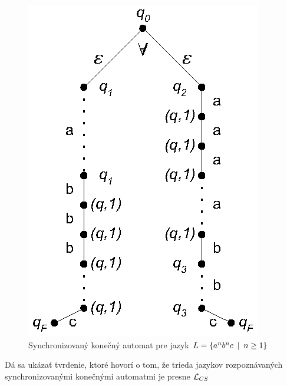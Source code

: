 \begin{figure}[!ht]
  \centering
  \includegraphics{img/anbnc}
  \caption{Synchronizovaný konečný automat pre jazyk $L=\{a^nb^nc\enspace |\enspace
  n\geq1\}$} \label{anbnc}
\end{figure}

\begin{poznamka}
  Dá sa ukázať tvrdenie, ktoré hovorí o tom, že trieda jazykov
  rozpoznávaných synchronizovanými konečnými automatmi je presne
  $\mathcal{L}_{CS}$
\end{poznamka}
